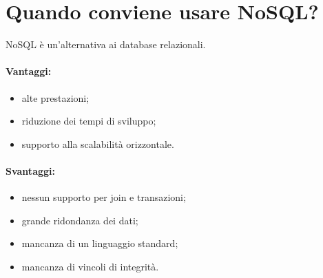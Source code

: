 \section{Quando conviene usare NoSQL?}

NoSQL è un'alternativa ai database relazionali.

\paragraph{Vantaggi:}

\begin{itemize}
    \item alte prestazioni;
    \item riduzione dei tempi di sviluppo;
    \item supporto alla scalabilità orizzontale.
\end{itemize}

\paragraph{Svantaggi:}

\begin{itemize}
    \item nessun supporto per join e transazioni;
    \item grande ridondanza dei dati;
    \item mancanza di un linguaggio standard;
    \item mancanza di vincoli di integrità.
\end{itemize}
